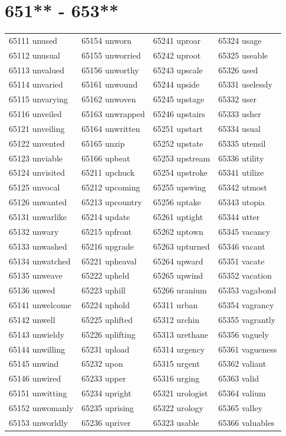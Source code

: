 \documentclass[10pt, oneside]{book}
\begin{document}
\begin{table}
	\centering
	\section*{651** - 653**}
	\begin{tabular}{l l l l}
65111 unused &65154 unworn &65241 uproar &65324 usage\\
65112 unusual &65155 unworried &65242 uproot &65325 useable\\
65113 unvalued &65156 unworthy &65243 upscale &65326 used\\
65114 unvaried &65161 unwound &65244 upside &65331 uselessly\\
65115 unvarying &65162 unwoven &65245 upstage &65332 user\\
65116 unveiled &65163 unwrapped &65246 upstairs &65333 usher\\
65121 unveiling &65164 unwritten &65251 upstart &65334 usual\\
65122 unvented &65165 unzip &65252 upstate &65335 utensil\\
65123 unviable &65166 upbeat &65253 upstream &65336 utility\\
65124 unvisited &65211 upchuck &65254 upstroke &65341 utilize\\
65125 unvocal &65212 upcoming &65255 upswing &65342 utmost\\
65126 unwanted &65213 upcountry &65256 uptake &65343 utopia\\
65131 unwarlike &65214 update &65261 uptight &65344 utter\\
65132 unwary &65215 upfront &65262 uptown &65345 vacancy\\
65133 unwashed &65216 upgrade &65263 upturned &65346 vacant\\
65134 unwatched &65221 upheaval &65264 upward &65351 vacate\\
65135 unweave &65222 upheld &65265 upwind &65352 vacation\\
65136 unwed &65223 uphill &65266 uranium &65353 vagabond\\
65141 unwelcome &65224 uphold &65311 urban &65354 vagrancy\\
65142 unwell &65225 uplifted &65312 urchin &65355 vagrantly\\
65143 unwieldy &65226 uplifting &65313 urethane &65356 vaguely\\
65144 unwilling &65231 upload &65314 urgency &65361 vagueness\\
65145 unwind &65232 upon &65315 urgent &65362 valiant\\
65146 unwired &65233 upper &65316 urging &65363 valid\\
65151 unwitting &65234 upright &65321 urologist &65364 valium\\
65152 unwomanly &65235 uprising &65322 urology &65365 valley\\
65153 unworldly &65236 upriver &65323 usable &65366 valuables\\
	\end{tabular}
 \end{table}
\clearpage
\end{document}
